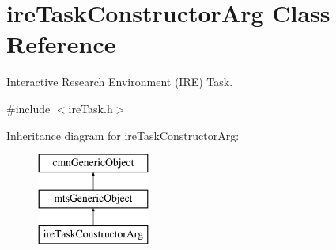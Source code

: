 \hypertarget{classire_task_constructor_arg}{}\section{ire\+Task\+Constructor\+Arg Class Reference}
\label{classire_task_constructor_arg}


Interactive Research Environment (I\+R\+E) Task.  




{\ttfamily \#include $<$ire\+Task.\+h$>$}

Inheritance diagram for ire\+Task\+Constructor\+Arg\+:\begin{figure}[H]
\begin{center}
\leavevmode
\includegraphics[height=3.000000cm]{d3/d00/classire_task_constructor_arg}
\end{center}
\end{figure}
